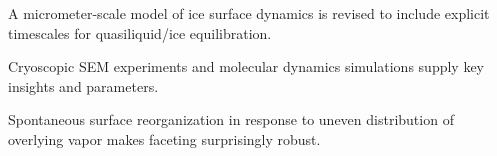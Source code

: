 \documentclass[draft]{agujournal2019}
\begin{document}











\begin{keypoints}
\item A micrometer-scale model of ice surface dynamics is revised to include explicit timescales for quasiliquid/ice equilibration.
\item Cryoscopic SEM experiments and molecular dynamics simulations supply key insights and parameters.
\item Spontaneous surface reorganization in response to uneven distribution of overlying vapor makes faceting surprisingly robust.

\end{keypoints}

%
%
\end{document}
